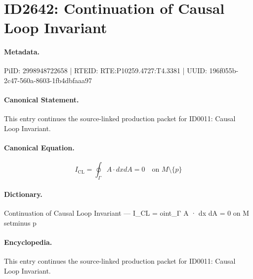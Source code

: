 \section*{ID2642: Continuation of Causal Loop Invariant}
\paragraph{Metadata.}
PiID: 2998948722658 | RTEID: RTE:P10259.4727:T4.3381 | UUID: 196f055b-2c47-560a-8603-1fb4dbfaaa97

\paragraph{Canonical Statement.}
This entry continues the source-linked production packet for ID0011: Causal Loop Invariant.

\paragraph{Canonical Equation.}
\[
I_{\mathrm{CL}} = \oint_{\Gamma} A \cdot dx dA = 0 \quad \text{on } M \setminus \{p\}
\]

\paragraph{Dictionary.}
Continuation of Causal Loop Invariant — I\_CL = oint\_Γ A · dx dA = 0 on M setminus p

\paragraph{Encyclopedia.}
This entry continues the source-linked production packet for ID0011: Causal Loop Invariant.
